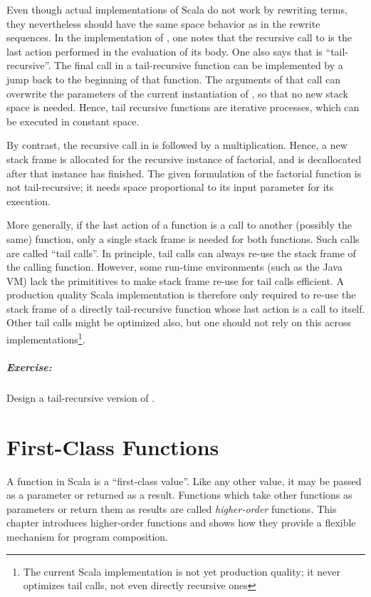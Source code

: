 \documentclass[11pt]{book}
\newcommand{\exercise}{\paragraph{Exercise:}}
\begin{document}
Even though actual implementations of Scala do not work by rewriting
terms, they nevertheless should have the same space behavior as in the
rewrite sequences. In the implementation of \verb@gcd@, one notes that
the recursive call to \verb@gcd@ is the last action performed in the
evaluation of its body. One also says that \verb@gcd@ is
``tail-recursive''. The final call in a tail-recursive function can be
implemented by a jump back to the beginning of that function. The
arguments of that call can overwrite the parameters of the current
instantiation of \verb@gcd@, so that no new stack space is needed.
Hence, tail recursive functions are iterative processes, which can be
executed in constant space.

By contrast, the recursive call in \verb@factorial@ is followed by a
multiplication.  Hence, a new stack frame is allocated for the
recursive instance of factorial, and is decallocated after that
instance has finished. The given formulation of the factorial function
is not tail-recursive; it needs space proportional to its input
parameter for its execution.

More generally, if the last action of a function is a call to another
(possibly the same) function, only a single stack frame is needed for
both functions. Such calls are called ``tail calls''. In principle,
tail calls can always re-use the stack frame of the calling function.
However, some run-time environments (such as the Java VM) lack the
primititives to make stack frame re-use for tail calls efficient.  A
production quality Scala implementation is therefore only required to re-use
the stack frame of a directly tail-recursive function whose last
action is a call to itself.  Other tail calls might be optimized also,
but one should not rely on this across
implementations\footnote{The current Scala implementation is not yet
production quality; it never optimizes tail calls, not even directly
recursive ones}.

\exercise Design a tail-recursive version of
\verb@factorial@.

\chapter{\label{chap:first-class-funs}First-Class Functions}

A function in Scala is a ``first-class value''. Like any other value,
it may be passed as a parameter or returned as a result.  Functions
which take other functions as parameters or return them as results are
called {\em higher-order} functions. This chapter introduces
higher-order functions and shows how they provide a flexible mechanism
for program composition.
\end{document}
